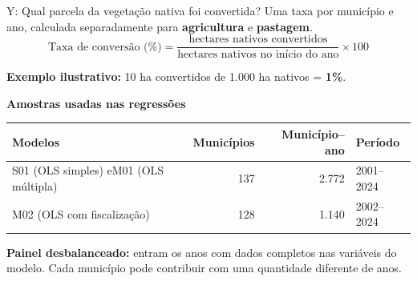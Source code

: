 \documentclass[aspectratio=169,11pt]{beamer}
\newcommand{\fonte}[1]{\par\vfill{\fontsize{7.5}{9}\selectfont\color{gray}Fonte: #1\par}}
\begin{document}
\begin{frame}{Y: Qual parcela da vegetação nativa foi convertida?}
Uma taxa por município e ano, calculada separadamente para \textbf{agricultura} e \textbf{pastagem}.
\medskip
\[
\text{Taxa de conversão (\%)}=
\frac{\text{hectares nativos convertidos}}{\text{hectares nativos no início do ano}}\times100
\]
\par\medskip
\textbf{Exemplo ilustrativo:} 10 ha convertidos de 1.000 ha nativos = \textbf{1\%}.
\par\bigskip
\small
\textbf{Amostras usadas nas regressões}\par\smallskip
\begin{tabularx}{\textwidth}{L r r l}
\toprule
\textbf{Modelos} & \textbf{Municípios} & \textbf{Município--ano} & \textbf{Período}\\
\midrule
S01 (OLS simples) e\newline M01 (OLS múltipla) & 137 & 2.772 & 2001--2024\\
M02 (OLS com fiscalização) & 128 & 1.140 & 2002--2024\\
\bottomrule
\end{tabularx}
\par\medskip
\textbf{Painel desbalanceado:} entram os anos com dados completos nas variáveis do modelo. Cada município pode contribuir com uma quantidade diferente de anos.
\end{frame}
\end{document}
